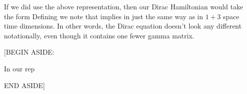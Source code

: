 If we did use the above representation, then our Dirac Hamiltonian would take the form
Defining
%
we note that 
%
implies
%
in just the same way as in $1+3$ space time dimensions.  In other words, the Dirac equation doesn't look any different notationally, even though it contains one fewer gamma matrix.

[BEGIN ASIDE:

In our rep
%

END ASIDE]

